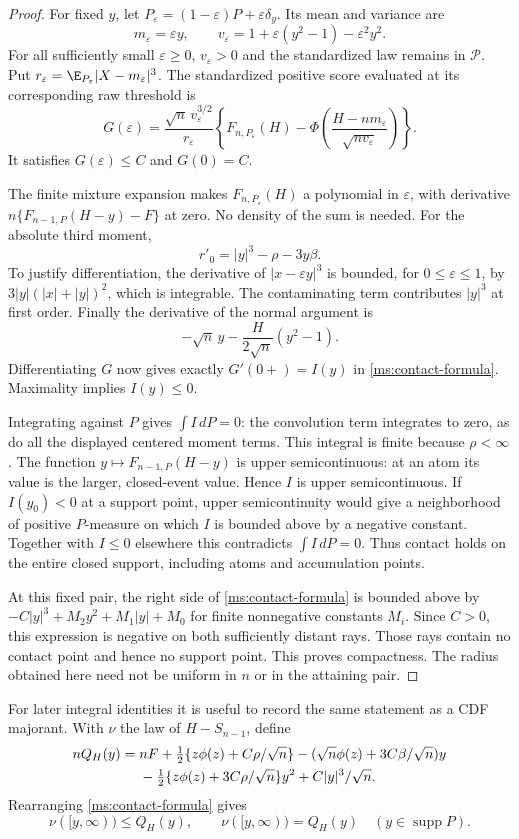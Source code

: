 \begin{proof}
For fixed $y$, let $P_\varepsilon=(1-\varepsilon)P+\varepsilon\delta_y$.
Its mean and variance are
\[
 m_\varepsilon=\varepsilon y,\qquad
 v_\varepsilon=1+\varepsilon(y^2-1)-\varepsilon^2y^2.
\]
For all sufficiently small $\varepsilon\ge0$, $v_\varepsilon>0$ and the
standardized law remains in $\mathcal P$. Put
$r_\varepsilon=\E_{P_\varepsilon}|X-m_\varepsilon|^3$. The standardized
positive score evaluated at its corresponding raw threshold is
\[
 G(\varepsilon)=\frac{\sqrt n\,v_\varepsilon^{3/2}}{r_\varepsilon}
 \left\{F_{n,P_\varepsilon}(H)
  -\Phi\!\left(\frac{H-nm_\varepsilon}{\sqrt{nv_\varepsilon}}\right)\right\}.
\]
It satisfies $G(\varepsilon)\le C$ and $G(0)=C$.

The finite mixture expansion makes $F_{n,P_\varepsilon}(H)$ a polynomial
in $\varepsilon$, with derivative
$n\{F_{n-1,P}(H-y)-F\}$ at zero. No density of the sum is needed.
For the absolute third moment,
\[
 r'_0=|y|^3-\rho-3y\beta.
\]
To justify differentiation, the derivative of $|x-\varepsilon y|^3$ is
bounded, for $0\le\varepsilon\le1$, by
$3|y|(|x|+|y|)^2$, which is integrable. The contaminating term contributes
$|y|^3$ at first order. Finally the derivative of the normal argument is
\[
 -\sqrt n\,y-\frac{H}{2\sqrt n}(y^2-1).
\]
Differentiating $G$ now gives exactly $G'(0+)=I(y)$ in
\eqref{ms:contact-formula}. Maximality implies $I(y)\le0$.

Integrating against $P$ gives $\int I\,dP=0$: the convolution term
integrates to zero, as do all the displayed centered moment terms. This
integral is finite because $\rho<\infty$. The function
$y\mapsto F_{n-1,P}(H-y)$ is upper semicontinuous: at an atom its value
is the larger, closed-event value. Hence $I$ is upper semicontinuous.
If $I(y_0)<0$ at a support point, upper semicontinuity would give a
neighborhood of positive $P$-measure on which $I$ is bounded above by a
negative constant. Together with $I\le0$ elsewhere this contradicts
$\int I\,dP=0$. Thus contact holds on the entire closed support, including
atoms and accumulation points.

At this fixed pair, the right side of \eqref{ms:contact-formula} is bounded
above by $-C|y|^3+M_2y^2+M_1|y|+M_0$ for finite nonnegative constants
$M_i$. Since $C>0$, this expression is negative on both sufficiently
distant rays. Those rays contain no contact point and hence no support
point. This proves compactness.
The radius obtained here need not be uniform in $n$ or in the attaining pair.
\end{proof}

For later integral identities it is useful to record the same statement as
a CDF majorant. With $\nu$ the law of $H-S_{n-1}$, define
\begin{align}
 nQ_H(y)={}&nF+\tfrac12\{z\phi(z)+C\rho/\sqrt n\}
   -(\sqrt n\phi(z)+3C\beta/\sqrt n)y\notag\\
 &-\tfrac12\{z\phi(z)+3C\rho/\sqrt n\}y^2
   +C|y|^3/\sqrt n.\label{ms:contact-majorant}
\end{align}
Rearranging \eqref{ms:contact-formula} gives
\[
 \nu([y,\infty))\le Q_H(y),
 \qquad \nu([y,\infty))=Q_H(y)\quad
                 (y\in\operatorname{supp}P).
\]
